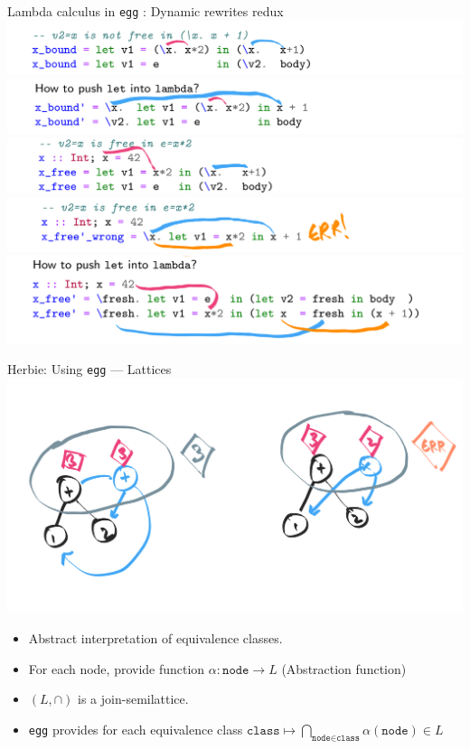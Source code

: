 \documentclass[8pt]{beamer}
\newcommand{\node}{\texttt{node}}
\newcommand{\class}{\texttt{class}}
\newcommand{\egg}{\texttt{egg} }
\begin{document}
\begin{frame}[fragile]{Lambda calculus in \egg: Dynamic rewrites redux}
\includegraphics[width=\textwidth]{./lc-1.png}
\pause
\includegraphics[width=\textwidth]{./lc-2.png}
\pause
\includegraphics[width=\textwidth]{./lc-3.png}
\pause
\includegraphics[width=\textwidth]{./lc-4.png}
\pause
\includegraphics[width=\textwidth]{./lc-5.png}
\end{frame}

\begin{frame}[fragile]{Herbie: Using \egg --- Lattices}
\includegraphics[width=\textwidth]{./analysis-equivalence-classes.png}
\pause
\begin{itemize}
\item Abstract interpretation of equivalence classes.
\item For each node, provide function $\alpha: \node \rightarrow L$ (Abstraction function)
\item $(L, \cap)$ is a join-semilattice.
\item \egg provides for each equivalence class $\class \mapsto \bigcap_{\node \in \class} \alpha(\node) \in L$
\end{itemize}
\end{frame}
\end{document}
